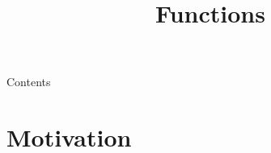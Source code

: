 
\newcommand {\topic}{
    Functions
}
\usepackage{tikz}
\usepackage[absolute,overlay]{textpos}

\setlength{\TPHorizModule}{1cm}
\setlength{\TPVertModule}{1cm}


\title{\topic}
\supertitle{\course}
\date{}



\maketitle

\begin{frame}{Contents}
    \tableofcontents
\end{frame}

\section{Motivation}

